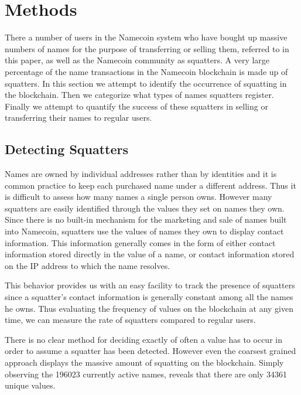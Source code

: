\section{Methods}
There a number of users in the Namecoin system who have bought up massive numbers of names for the purpose of transferring or selling them, referred to in this paper, as well as the Namecoin community as squatters. A very large percentage of the name transactions in the Namecoin blockchain is made up of squatters. In this section we attempt to identify the occurrence of squatting in the blockchain. Then we categorize what types of names squatters register. Finally we attempt to quantify the success of these squatters in selling or transferring their names to regular users.
\label{sec:methods}

\subsection{Detecting Squatters}

Names are owned by individual addresses rather than by identities and it is common practice to keep each purchased name under a different address. Thus it is difficult to assess how many names a single person owns. However many squatters are easily identified through the values they set on names they own. Since there is no built-in mechanism for the marketing and sale of names built into Namecoin, squatters use the values of names they own to display contact information. This information generally comes in the form of either contact information stored directly in the value of a name, or contact information stored on the IP address to which the name resolves.

This behavior provides us with an easy facility to track the presence of squatters since a squatter's contact information is generally constant among all the names he owns. Thus evaluating the frequency of values on the blockchain at any given time, we can measure the rate of squatters compared to regular users.

There is no clear method for deciding exactly of often a value has to occur in order to assume a squatter has been detected. However even the coarsest grained approach displays the massive amount of squatting on the blockchain. Simply observing the 196023 currently active names, reveals that there are only 34361 unique values.


